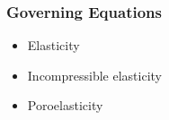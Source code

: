 \documentclass[aspectratio=169]{beamer}
\begin{document}
\begin{frame}
  \frametitle{Governing Equations}
  \summary{}

  \begin{itemize}
  \item Elasticity
  \item Incompressible elasticity
  \item Poroelasticity
  \end{itemize}

  \vfill
  
  
\end{frame}

\end{document}
